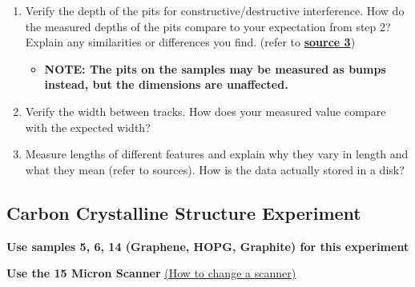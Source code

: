 \documentclass{../lab}
\begin{document}
\begin{enumerate}
    \item Verify the depth of the pits for constructive/destructive interference. How do the measured depths of the pits compare to your expectation from step 2? Explain any similarities or differences you find. (refer to \href{http://experimentationlab.berkeley.edu/sites/default/files/How_do_Rewriteable_CDs_work.pdf}{\textbf{source 3}})

    \begin{itemize}
        \item \textbf{NOTE: The pits on the samples may be measured as bumps instead, but the dimensions are unaffected.}

    \end{itemize}

    \item Verify the width between tracks. How does your measured value compare with the expected width?

    \item Measure lengths of different features and explain why they vary in length and what they mean (refer to sources). How is the data actually stored in a disk?

\end{enumerate}

\subsection{Carbon Crystalline Structure Experiment}
\label{subsec:CarbonCrystal}

\textbf{Use samples 5, 6, 14 (Graphene, HOPG, Graphite) for this experiment}

\textbf{Use the 15 Micron Scanner} \hyperref[subsec:ChangingScanners]{(How to change a scanner)}
\end{document}
